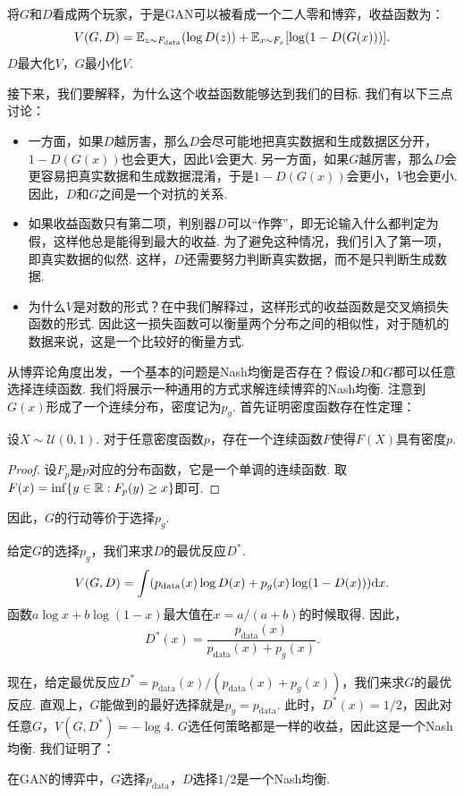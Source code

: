 将$G$和$D$看成两个玩家，于是GAN可以被看成一个二人零和博弈，收益函数为：
    \[
        V(G,D)=\mathbb{E}_{z\sim F_{\text{data}}}(\log D(z))+\mathbb{E}_{x\sim F_x}[\log(1-D(G(x)))].
    \]
$D$最大化$V$，$G$最小化$V$.

接下来，我们要解释，为什么这个收益函数能够达到我们的目标. 我们有以下三点讨论：

\begin{itemize}
    \item 一方面，如果$D$越厉害，那么$D$会尽可能地把真实数据和生成数据区分开，$1-D(G(x))$也会更大，因此$V$会更大. 另一方面，如果$G$越厉害，那么$D$会更容易把真实数据和生成数据混淆，于是$1-D(G(x))$会更小，$V$也会更小. 因此，$D$和$G$之间是一个对抗的关系.
    
    \item 如果收益函数只有第二项，判别器$D$可以“作弊”，即无论输入什么都判定为假，这样他总是能得到最大的收益. 为了避免这种情况，我们引入了第一项，即真实数据的似然. 这样，$D$还需要努力判断真实数据，而不是只判断生成数据.
    
    \item 为什么$V$是对数的形式？在中我们解释过，这样形式的收益函数是交叉熵损失函数的形式. 因此这一损失函数可以衡量两个分布之间的相似性，对于随机的数据来说，这是一个比较好的衡量方式.
\end{itemize}


从博弈论角度出发，一个基本的问题是Nash均衡是否存在？假设$D$和$G$都可以任意选择连续函数. 我们将展示一种通用的方式求解连续博弈的Nash均衡. 注意到$G(x)$形成了一个连续分布，密度记为$p_g$.  首先证明密度函数存在性定理：
\begin{theorem}
设$X\sim \mathcal U(0,1)$. 对于任意密度函数$p$，存在一个连续函数$F$使得$F(X)$具有密度$p$.
\end{theorem}
\begin{proof}
设$F_p$是$p$对应的分布函数，它是一个单调的连续函数. 取$F(x)=\inf\{y\in \mathbb{R}: F_p(y)\geq x\}$即可.
\end{proof}
因此，$G$的行动等价于选择$p_g$.

给定$G$的选择$p_g$，我们来求$D$的最优反应$D^*$.
    \[V(G,D)=\int (p_{\text{data}}(x)\log D(x)+p_g(x)\log(1-D(x)))\mathrm{d} x.\]
函数$a\log x+b\log(1-x)$最大值在$x=a/(a+b)$的时候取得. 因此，
    \[D^*(x)=\frac{p_{\text{data}}(x)}{p_{\text{data}}(x)+p_g(x)}.\]
    
现在，给定最优反应$D^*=p_{\text{data}}(x)/(p_{\text{data}}(x)+p_g(x))$，我们来求$G$的最优反应. 直观上，$G$能做到的最好选择就是$p_g=p_{\text{data}}$. 此时，$D^*(x)=1/2$，因此对任意$G$，$V(G,D^*)=-\log 4$. $G$选任何策略都是一样的收益，因此这是一个Nash均衡. 我们证明了：
\begin{theorem}[GAN的Nash均衡存在性]
在GAN的博弈中，$G$选择$p_{\text{data}}$，$D$选择$1/2$是一个Nash均衡.
\end{theorem}

